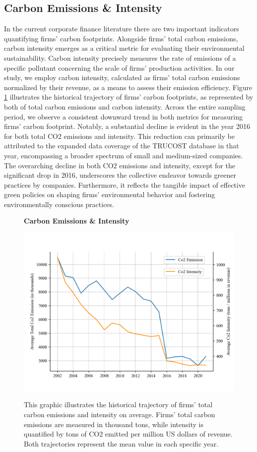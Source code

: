 \documentclass[12pt]{article}
\begin{document}
\subsection{Carbon Emissions \& Intensity}

In the current corporate finance literature there are two important indicators quantifying firms' carbon footprints. Alongside firms' total carbon emissions, carbon intensity emerges as a critical metric for evaluating their environmental sustainability. Carbon intensity precisely measures the rate of emissions of a specific pollutant concerning the scale of firms' production activities. In our study, we employ carbon intensity, calculated as firms' total carbon emissions normalized by their revenue, as a means to assess their emission efficiency. Figure \ref{fig: co2_intensity} illustrates the historical trajectory of firms' carbon footprints, as represented by both of total carbon emissions and carbon intensity. Across the entire sampling period, we observe a consistent downward trend in both metrics for measuring firms' carbon footprint. Notably, a substantial decline is evident in the year 2016 for both total CO2 emissions and intensity. This reduction can primarily be attributed to the expanded data coverage of the TRUCOST database in that year, encompassing a broader spectrum of small and medium-sized companies. The overarching decline in both CO2 emissions and intensity, except for the significant drop in 2016, underscores the collective endeavor towards greener practices by companies. Furthermore, it reflects the tangible impact of effective green policies on shaping firms' environmental behavior and fostering environmentally conscious practices.

\begin{figure}[!ht]
\centering
\caption{\textbf{Carbon Emissions \& Intensity}}
\includegraphics{graphics/co2_trend.png}
\label{fig: co2_intensity}
\caption*{\footnotesize{This graphic illustrates the historical trajectory of firms' total carbon emissions and intensity on average. Firms' total carbon emissions are measured in thousand tons, while intensity is quantified by tons of CO2 emitted per million US dollars of revenue. Both trajectories represent the mean value in each specific year.}}
\end{figure}
\end{document}
